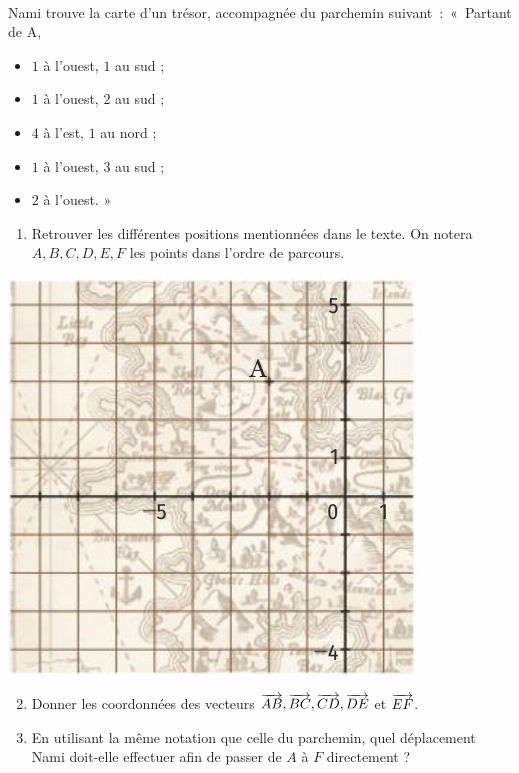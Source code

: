 \documentclass[11pt]{article}
\begin{document}
\begin{exo}~\\%
  \begin{minipage}{.6\textwidth}
    Nami trouve la carte d'un trésor, accompagnée du parchemin
    suivant~:~«~Partant de A,
    \begin{itemize}
      \item $1$ à l'ouest, $1$ au sud ;
      \item $1$ à l'ouest, $2$ au sud ;
      \item $4$ à l'est, $1$ au nord ;
      \item $1$ à l'ouest, $3$ au sud ;
      \item $2$ à l'ouest. »
    \end{itemize}
    \begin{enumerate}
      \item Retrouver les différentes positions mentionnées dans le texte. On
        notera $A, B, C, D, E, F$ les points dans l'ordre de parcours.
    \end{enumerate}
  \end{minipage}
  \begin{minipage}{.4\textwidth}
    \begin{center}
      \includegraphics[scale=.4]{carte.png}
    \end{center}
  \end{minipage}
  \begin{enumerate}
      \setcounter{enumi}{1}
    \item Donner les coordonnées des vecteurs $\overrightarrow{AB}, \overrightarrow{BC},
      \overrightarrow{CD}, \overrightarrow{DE}$ et $\overrightarrow{EF}$.
    \item En utilisant la même notation que celle du parchemin, quel déplacement
      Nami doit-elle effectuer afin de passer de $A$ à $F$ directement ?
  \end{enumerate}
\end{exo}
\end{document}

